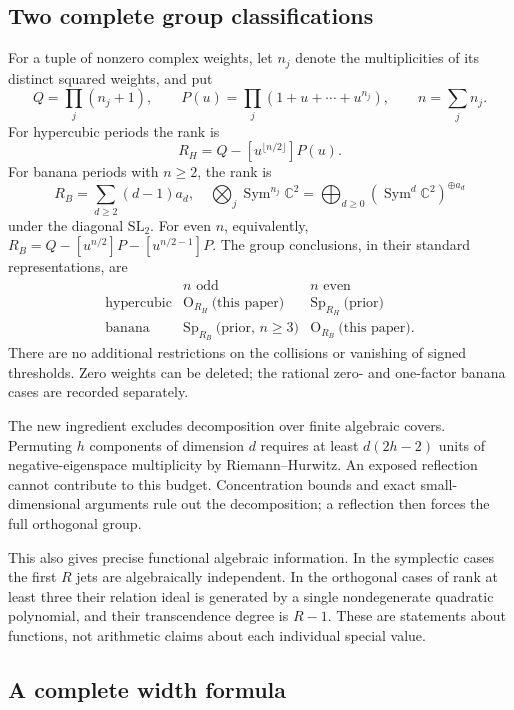 \documentclass[11pt,a4paper]{article}
\theoremstyle{definition}
\theoremstyle{remark}
\numberwithin{equation}{section}
\begin{document}
\subsection{Two complete group classifications}

For a tuple of nonzero complex weights, let $n_j$ denote the multiplicities
of its distinct squared weights, and put
\[
 Q=\prod_j(n_j+1),\qquad
 P(u)=\prod_j(1+u+\cdots+u^{n_j}),\qquad n=\sum_jn_j.
\]
For hypercubic periods the rank is
\[
 R_H=Q-[u^{\lfloor n/2\rfloor}]P(u).
\]
For banana periods with $n\ge2$, the rank is
\[
 R_B=\sum_{d\ge2}(d-1)a_d,
 \quad
 \bigotimes_j\operatorname{Sym}^{n_j}\mathbb C^2
 =\bigoplus_{d\ge0}(\operatorname{Sym}^d\mathbb C^2)^{\oplus a_d}
\]
under the diagonal $\mathrm{SL}_2$. For even $n$, equivalently,
$R_B=Q-[u^{n/2}]P-[u^{n/2-1}]P$.
The group conclusions, in their standard representations, are
\[
\begin{array}{c|cc}
 & n\text{ odd}&n\text{ even}\\ \hline
\text{hypercubic}&\mathrm O_{R_H}\ \text{(this paper)}
                         &\mathrm{Sp}_{R_H}\ \text{(prior)}\\
\text{banana}&\mathrm{Sp}_{R_B}\ \text{(prior, }n\ge3\text{)}
                         &\mathrm O_{R_B}\ \text{(this paper)}.
\end{array}
\]
There are no additional restrictions on the collisions or vanishing
of signed thresholds. Zero weights can be deleted; the rational
zero- and one-factor banana cases are recorded separately.

The new ingredient excludes decomposition over finite algebraic covers.
Permuting $h$ components of dimension $d$ requires at least $d(2h-2)$
units of negative-eigenspace multiplicity by Riemann--Hurwitz.
An exposed reflection cannot contribute to this budget. Concentration
bounds and exact small-dimensional arguments rule out the decomposition;
a reflection then forces the full orthogonal group.

This also gives precise functional algebraic information. In the
symplectic cases the first $R$ jets are algebraically independent.
In the orthogonal cases of rank at least three their relation ideal
is generated by a single nondegenerate quadratic polynomial, and
their transcendence degree is $R-1$. These are statements about
functions, not arithmetic claims about each individual special value.

\subsection{A complete width formula}
\end{document}

